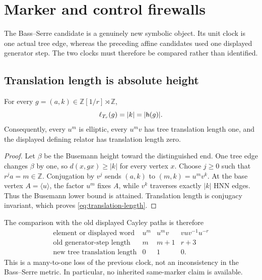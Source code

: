 \section{Marker and control firewalls}
\label{sec:marker-controls}

The Bass--Serre candidate is a genuinely new symbolic object.  Its unit clock
is one actual tree edge, whereas the preceding affine candidates used one
displayed generator step.  The two clocks must therefore be compared rather
than identified.

\subsection{Translation length is absolute height}

\begin{proposition}
\label{prop:translation-length}
For every $g=(a,k)\in\mathbb Z[1/r]\rtimes\mathbb Z$,
\begin{equation}
  \ell_{T_r}(g)=|k|=|\mathsf{h}(g)|.
  \label{eq:translation-length}
\end{equation}
Consequently, every $u^m$ is elliptic, every $u^mv$ has tree translation
length one, and the displayed defining relator has translation length zero.
\end{proposition}

\begin{proof}
Let $\beta$ be the Busemann height toward the distinguished end.  One tree
edge changes $\beta$ by one, so $d(x,gx)\ge |k|$ for every vertex $x$.
Choose $j\ge0$ such that $r^ja=m\in\mathbb Z$.  Conjugation by $v^j$ sends
$(a,k)$ to $(m,k)=u^mv^k$.  At the base vertex $A=\langle u\rangle$, the
factor $u^m$ fixes $A$, while $v^k$ traverses exactly $|k|$ HNN edges.
Thus the Busemann lower bound is attained.  Translation length is conjugacy
invariant, which proves \eqref{eq:translation-length}.
\end{proof}

The comparison with the old displayed Cayley paths is therefore
\begin{equation}
\begin{array}{c|ccc}
\text{element or displayed word} & u^m & u^mv & vuv^{-1}u^{-r} \\
\hline
\text{old generator-step length} & m & m+1 & r+3 \\
\text{new tree translation length} & 0 & 1 & 0 .
\end{array}
\label{eq:marker-table}
\end{equation}
This is a many-to-one loss of the previous clock, not an inconsistency in
the Bass--Serre metric.  In particular, no inherited same-marker claim is
available.

